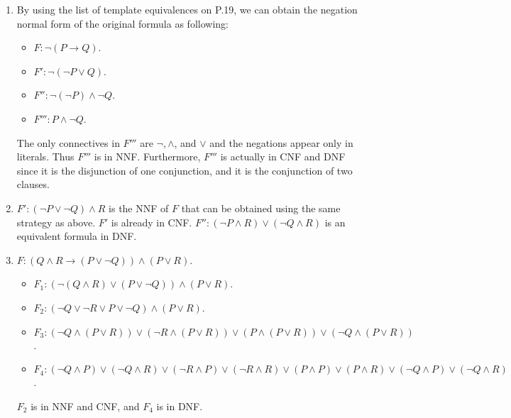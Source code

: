 \begin{exer}[1.5]
    $ $
    \begin{enumerate}[label=(\alph*)]
        \item
            By using the list of template equivalences on P.19, we can obtain the negation normal form of the original formula as following:
            \begin{itemize}
                \item
                    $F: \neg (P \rightarrow Q)$.
                \item
                    $F': \neg (\neg P \lor Q)$.
                \item
                    $F'': \neg (\neg P) \land \neg Q$.
                \item
                    $F''': P \land \neg Q$.
            \end{itemize}
            The only connectives in $F'''$ are $\neg, \land$, and $\lor$ and the negations appear only in literals.
            Thus $F'''$ is in NNF.
            Furthermore, $F'''$ is actually in CNF and DNF since it is the disjunction of one conjunction, and it is the conjunction of two clauses.
        \item
            $F': (\neg P \lor \neg Q) \land R$ is the NNF of $F$ that can be obtained using the same strategy as above.
            $F'$ is already in CNF.
            $F'': (\neg P \land R) \lor (\neg Q \land R)$ is an equivalent formula in DNF.
        \item
            $F:(Q \land R \rightarrow (P \lor \neg Q)) \land (P \lor R)$.
            \begin{itemize}
                \item
                    $F_1: (\neg (Q \land R) \lor (P \lor \neg Q)) \land (P \lor R)$.
                \item
                    $F_2: (\neg Q \lor \neg R \lor P \lor \neg Q) \land (P \lor R)$.
                \item
                    $F_3: (\neg Q \land (P \lor R)) \lor (\neg R \land (P \lor R)) \lor (P \land (P \lor R)) \lor (\neg Q \land (P \lor R))$.
                \item
                    $F_4: (\neg Q \land P) \lor (\neg Q \land R) \lor (\neg R \land P) \lor (\neg R \land R) \lor (P \land P) \lor (P \land R) \lor (\neg Q \land P) \lor (\neg Q \land R)$.
            \end{itemize}
            $F_2$ is in NNF and CNF, and $F_4$ is in DNF.
    \end{enumerate}
\end{exer}

